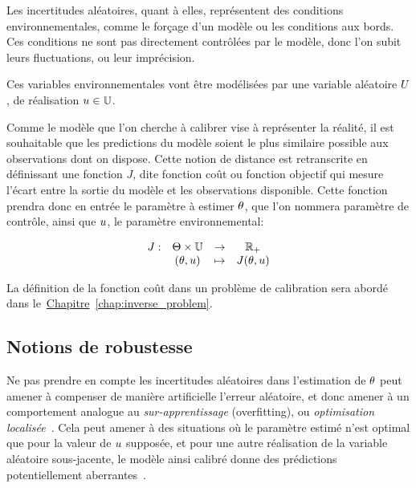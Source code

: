 \documentclass[../../Main_ManuscritThese.tex]{subfiles}
\newcommand{\frchap}[1]{\hyperref[#1]{Chapitre}~\ref{#1}}
\begin{document}
Les incertitudes aléatoires, quant à elles, représentent des
conditions environnementales, comme le forçage d'un modèle ou les
conditions aux bords. Ces conditions ne sont pas directement
contrôlées par le modèle, donc l'on subit leurs fluctuations, ou leur
imprécision.

Ces variables environnementales vont être modélisées par une variable
aléatoire $U$, de réalisation $u\in \mathbb{U}$.

Comme le modèle que l'on cherche à calibrer vise à représenter la
réalité, il est souhaitable que les predictions du modèle soient le
plus similaire possible aux observations dont on dispose. Cette notion
de distance est retranscrite en définissant une fonction $J$, dite
fonction coût ou fonction objectif qui mesure l'écart entre la sortie
du modèle et les observations disponible. Cette fonction prendra donc
en entrée le paramètre à estimer $\theta$, que l'on nommera paramètre de
contrôle, ainsi que $u$, le paramètre environnemental:

\begin{equation}
  \label{eq:def_J}
  \begin{array}{rccc}
   J: & \Theta\times\mathbb{U}& \rightarrow& \mathbb{R}_+ \\
   &(\theta,u)& \mapsto& J(\theta,u)
  \end{array}
\end{equation}

La définition de la fonction coût dans un problème de calibration sera abordé dans le~\frchap{chap:inverse_problem}.

\subsection*{Notions de robustesse}

Ne pas prendre en compte les incertitudes aléatoires dans l'estimation
de $\theta$ peut amener à compenser de manière artificielle l'erreur
aléatoire, et donc amener à un comportement analogue au
\emph{sur-apprentissage} (overfitting), ou \emph{optimisation
  localisée}~\cite{huyse_probabilistic_2002}. Cela peut amener à des
situations où le paramètre estimé n'est optimal que pour la valeur de
$u$ supposée, et pour une autre réalisation de la variable aléatoire
sous-jacente, le modèle ainsi calibré donne des prédictions
potentiellement aberrantes~\cite{kuczera_there_2010}.
\end{document}
